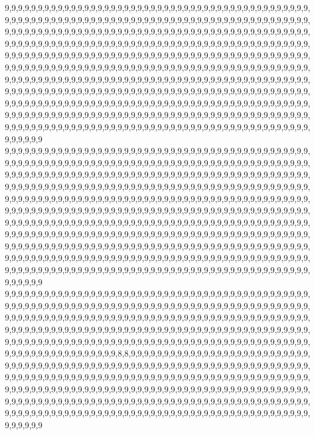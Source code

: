 9,9,9,9,9,9,9,9,9,9,9,9,9,9,9,9,9,9,9,9,9,9,9,9,9,9,9,9,9,9,9,9,9,9,9,9,9,9,9,9,9,9,9,9,9,9,9,9,9,9,9,9,9,9,9,9,9,9,9,9,9,9,9,9,9,9,9,9,9,9,9,9,9,9,9,9,9,9,9,9,9,9,9,9,9,9,9,9,9,9,9,9,9,9,9,9,9,9,9,9,9,9,9,9,9,9,9,9,9,9,9,9,9,9,9,9,9,9,9,9,9,9,9,9,9,9,9,9,9,9,9,9,9,9,9,9,9,9,9,9,9,9,9,9,9,9,9,9,9,9,9,9,9,9,9,9,9,9,9,9,9,9,9,9,9,9,9,9,9,9,9,9,9,9,9,9,9,9,9,9,9,9,9,9,9,9,9,9,9,9,9,9,9,9,9,9,9,9,9,9,9,9,9,9,9,9,9,9,9,9,9,9,9,9,9,9,9,9,9,9,9,9,9,9,9,9,9,9,9,9,9,9,9,9,9,9,9,9,9,9,9,9,9,9,9,9,9,9,9,9,9,9,9,9,9,9,9,9,9,9,9,9,9,9,9,9,9,9,9,9,9,9,9,9,9,9,9,9,9,9,9,9,9,9,9,9,9,9,9,9,9,9,9,9,9,9,9,9,9,9,9,9,9,9,9,9,9,9,9,9,9,9,9,9,9,9,9,9,9,9,9,9,9,9,9,9,9,9,9,9,9,9,9,9,9,9,9,9,9,9,9,9,9,9,9,9,9,9,9,9,9,9,9,9,9,9,9,9,9,9,9,9,9,9,9,9,9,9,9,9,9,9,9,9,9,9,9,9,9,9,9,9,9,9,9,9,9,9,9,9,9,9,9,9,9,9,9,9,9,9,9,9,9,9,9,9,9,9,9,9,9,9,9,9,9,9,9,9,9,9,9,9,9,9,9,9,9,9,9,9,9,9,9,9,9,9,9,9,9,9,9,9,9,9,9,9,9,9,9,9,9,9,9,9,9,9,9,9,9,9,9,9,9,9,9,9,9,9,9,9,9,9,9,9,9,9,9,9,9,9,9,9,9,9,9,9,9,9,9,9,9,9,9,9,9,9,9,9,9,9,9,9,9,9,9,9,9,9,9,9,9,9
9,9,9,9,9,9,9,9,9,9,9,9,9,9,9,9,9,9,9,9,9,9,9,9,9,9,9,9,9,9,9,9,9,9,9,9,9,9,9,9,9,9,9,9,9,9,9,9,9,9,9,9,9,9,9,9,9,9,9,9,9,9,9,9,9,9,9,9,9,9,9,9,9,9,9,9,9,9,9,9,9,9,9,9,9,9,9,9,9,9,9,9,9,9,9,9,9,9,9,9,9,9,9,9,9,9,9,9,9,9,9,9,9,9,9,9,9,9,9,9,9,9,9,9,9,9,9,9,9,9,9,9,9,9,9,9,9,9,9,9,9,9,9,9,9,9,9,9,9,9,9,9,9,9,9,9,9,9,9,9,9,9,9,9,9,9,9,9,9,9,9,9,9,9,9,9,9,9,9,9,9,9,9,9,9,9,9,9,9,9,9,9,9,9,9,9,9,9,9,9,9,9,9,9,9,9,9,9,9,9,9,9,9,9,9,9,9,9,9,9,9,9,9,9,9,9,9,9,9,9,9,9,9,9,9,9,9,9,9,9,9,9,9,9,9,9,9,9,9,9,9,9,9,9,9,9,9,9,9,9,9,9,9,9,9,9,9,9,9,9,9,9,9,9,9,9,9,9,9,9,9,9,9,9,9,9,9,9,9,9,9,9,9,9,9,9,9,9,9,9,9,9,9,9,9,9,9,9,9,9,9,9,9,9,9,9,9,9,9,9,9,9,9,9,9,9,9,9,9,9,9,9,9,9,9,9,9,9,9,9,9,9,9,9,9,9,9,9,9,9,9,9,9,9,9,9,9,9,9,9,9,9,9,9,9,9,9,9,9,9,9,9,9,9,9,9,9,9,9,9,9,9,9,9,9,9,9,9,9,9,9,9,9,9,9,9,9,9,9,9,9,9,9,9,9,9,9,9,9,9,9,9,9,9,9,9,9,9,9,9,9,9,9,9,9,9,9,9,9,9,9,9,9,9,9,9,9,9,9,9,9,9,9,9,9,9,9,9,9,9,9,9,9,9,9,9,9,9,9,9,9,9,9,9,9,9,9,9,9,9,9,9,9,9,9,9,9,9,9,9,9,9,9,9,9,9,9,9,9,9,9,9,9,9,9,9,9,9,9,9,9,9,9,9,9,9,9,9,9,9,9,9
9,9,9,9,9,9,9,9,9,9,9,9,9,9,9,9,9,9,9,9,9,9,9,9,9,9,9,9,9,9,9,9,9,9,9,9,9,9,9,9,9,9,9,9,9,9,9,9,9,9,9,9,9,9,9,9,9,9,9,9,9,9,9,9,9,9,9,9,9,9,9,9,9,9,9,9,9,9,9,9,9,9,9,9,9,9,9,9,9,9,9,9,9,9,9,9,9,9,9,9,9,9,9,9,9,9,9,9,9,9,9,9,9,9,9,9,9,9,9,9,9,9,9,9,9,9,9,9,9,9,9,9,9,9,9,9,9,9,9,9,9,9,9,9,9,9,9,9,9,9,9,9,9,9,9,9,9,9,9,9,9,9,9,9,9,9,9,9,9,9,9,9,9,9,9,9,9,9,9,9,9,9,9,9,9,9,9,9,9,9,9,9,9,9,9,9,9,9,9,9,9,9,9,9,9,9,9,9,9,9,9,9,9,9,9,9,9,9,9,9,9,9,9,9,9,9,9,9,9,9,9,9,9,9,9,9,9,9,9,9,9,9,9,9,9,9,9,8,8,9,9,9,9,9,9,9,9,9,9,9,9,9,9,9,9,9,9,9,9,9,9,9,9,9,9,9,9,9,9,9,9,9,9,9,9,9,9,9,9,9,9,9,9,9,9,9,9,9,9,9,9,9,9,9,9,9,9,9,9,9,9,9,9,9,9,9,9,9,9,9,9,9,9,9,9,9,9,9,9,9,9,9,9,9,9,9,9,9,9,9,9,9,9,9,9,9,9,9,9,9,9,9,9,9,9,9,9,9,9,9,9,9,9,9,9,9,9,9,9,9,9,9,9,9,9,9,9,9,9,9,9,9,9,9,9,9,9,9,9,9,9,9,9,9,9,9,9,9,9,9,9,9,9,9,9,9,9,9,9,9,9,9,9,9,9,9,9,9,9,9,9,9,9,9,9,9,9,9,9,9,9,9,9,9,9,9,9,9,9,9,9,9,9,9,9,9,9,9,9,9,9,9,9,9,9,9,9,9,9,9,9,9,9,9,9,9,9,9,9,9,9,9,9,9,9,9,9,9,9,9,9,9,9,9,9,9,9,9,9,9,9,9,9,9,9,9,9,9,9,9,9,9,9,9,9,9,9,9,9,9,9,9
